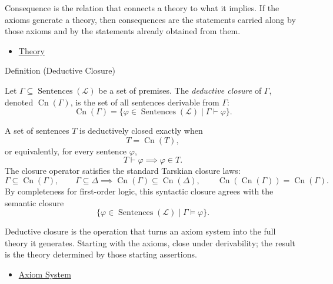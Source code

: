 \begin{remark*}[Interpretation]
Consequence is the relation that connects a theory to what it implies. If the
axioms generate a theory, then consequences are the statements carried along
by those axioms and by the statements already obtained from them.
\end{remark*}

\begin{dependencies}
\begin{itemize}
  \item \hyperref[def:axiom-systems-theory]{Theory}
\end{itemize}
\end{dependencies}

\begin{definitionbox}{Definition (Deductive Closure)}
\begin{definition}
\label{def:deductive-closure}
Let $\Gamma\subseteq\operatorname{Sentences}(\mathcal{L})$ be a set of
premises. The \emph{deductive closure} of $\Gamma$, denoted
$\operatorname{Cn}(\Gamma)$, is the set of all sentences derivable from
$\Gamma$:
\[
  \operatorname{Cn}(\Gamma)
  =
  \{\varphi\in\operatorname{Sentences}(\mathcal{L})\mid
    \Gamma\vdash\varphi\}.
\]
\end{definition}
\end{definitionbox}

\begin{remark*}
A set of sentences $T$ is deductively closed exactly when
\[
  T=\operatorname{Cn}(T),
\]
or equivalently, for every sentence $\varphi$,
\[
  T\vdash\varphi \implies \varphi\in T.
\]
The closure operator satisfies the standard Tarskian closure laws:
\[
  \Gamma\subseteq\operatorname{Cn}(\Gamma),
  \qquad
  \Gamma\subseteq\Delta\implies
  \operatorname{Cn}(\Gamma)\subseteq\operatorname{Cn}(\Delta),
  \qquad
  \operatorname{Cn}(\operatorname{Cn}(\Gamma))
  =\operatorname{Cn}(\Gamma).
\]
By completeness for first-order logic, this syntactic closure agrees with the
semantic closure
\[
  \{\varphi\in\operatorname{Sentences}(\mathcal{L})\mid
    \Gamma\vDash\varphi\}.
\]
\end{remark*}

\begin{remark*}[Interpretation]
Deductive closure is the operation that turns an axiom system into the full
theory it generates. Starting with the axioms, close under derivability; the
result is the theory determined by those starting assertions.
\end{remark*}

\begin{dependencies}
\begin{itemize}
  \item \hyperref[def:axiom-system]{Axiom System}
\end{itemize}
\end{dependencies}
